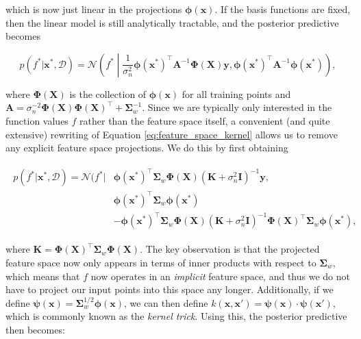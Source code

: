 \noindent which is now just linear in the projections $\bm\phi(\mathbf{x})$. If the basis functions are fixed, then the linear model is still analytically tractable, and the posterior predictive becomes

\begin{equation}
    p(f^*|\mathbf{x}^*, \mathcal{D}) = \mathcal{N}\left(f^*\middle|\frac{1}{\sigma_n^2}\bm\phi(\mathbf{x}^*)^\top \mathbf{A}^{-1}\bm\Phi(\mathbf{X})\mathbf{y}, \bm\phi(\mathbf{x}^*)^\top \mathbf{A}^{-1}\bm\phi(\mathbf{x}^*)\right),
    \label{eq:feature_space_kernel}
\end{equation}

\noindent where $\bm\Phi(\mathbf{X})$ is the collection of $\bm\phi(\mathbf{x})$ for all training points and $\mathbf{A} = \sigma_n^{-2}\bm\Phi(\mathbf{X}) \bm\Phi(\mathbf{X})^\top+\bm\Sigma_w^{-1}$. Since we are typically only interested in the function values $f$ rather than the feature space itself, a convenient (and quite extensive) rewriting of Equation \ref{eq:feature_space_kernel} allows us to remove any explicit feature space projections. We do this by first obtaining

\begin{align}
\begin{split}
    p(f^*|\mathbf{x}^*, \mathcal{D}) = \mathcal{N}(f^*\big|&\bm\phi(\mathbf{x}^*)^\top\bm\Sigma_w\bm\Phi(\mathbf{X})(\mathbf{K}+\sigma_n^2\mathbf{I})^{-1}\mathbf{y}, \\
    &\bm\phi(\mathbf{x}^*)^\top\bm\Sigma_w\bm\phi(\mathbf{x}^*)\\
    &-\bm\phi(\mathbf{x}^*)^\top\bm\Sigma_w\bm\Phi(\mathbf{X})(\mathbf{K}+\sigma_n^2\mathbf{I})^{-1}\bm\Phi(\mathbf{X})^\top\bm\Sigma_w\bm\phi(\mathbf{x}^*),
\end{split}
\end{align}

\noindent where $\mathbf{K}=\bm\Phi(\mathbf{X})^\top\bm\Sigma_w\bm\Phi(\mathbf{X})$. The key observation is that the projected feature space now only appears in terms of inner products with respect to $\bm\Sigma_w$, which means that $f$ now operates in an \textit{implicit} feature space, and thus we do not have to project our input points into this space any longer. Additionally, if we define $\bm\psi(\mathbf{x})=\bm\Sigma_w^{1/2}\bm\phi(\mathbf{x})$, we can then define $k(\mathbf{x},\mathbf{x}')=\bm\psi(\mathbf{x})\cdot\bm\psi(\mathbf{x}')$, which is commonly known as the \textit{kernel trick}. Using this, the posterior predictive then becomes:

